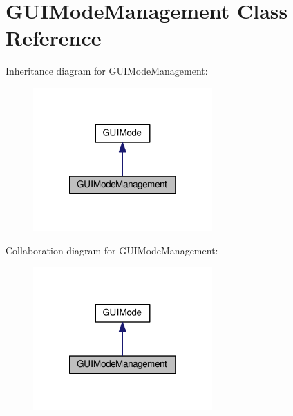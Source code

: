 \hypertarget{classGUIModeManagement}{\section{G\-U\-I\-Mode\-Management Class Reference}
\label{classGUIModeManagement}
}


Inheritance diagram for G\-U\-I\-Mode\-Management\-:
\nopagebreak
\begin{figure}[H]
\begin{center}
\leavevmode
\includegraphics[width=194pt]{classGUIModeManagement__inherit__graph}
\end{center}
\end{figure}


Collaboration diagram for G\-U\-I\-Mode\-Management\-:
\nopagebreak
\begin{figure}[H]
\begin{center}
\leavevmode
\includegraphics[width=194pt]{classGUIModeManagement__coll__graph}
\end{center}
\end{figure}
